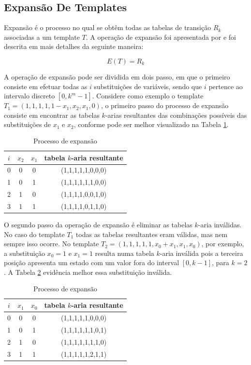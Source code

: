 \documentclass[12pt,a4paper]{article}
\begin{document}
\newpage\newpage
\subsection{Expansão De Templates}
	Expansão é o processo no qual se obtêm todas as tabelas de transição $R_k$ associadas a um template $T$.
	A operação de expansão foi apresentada por  e foi descrita em mais detalhes da seguinte maneira:

	\begin{equation}
	E(T)=R_k
	\end{equation}

	A operação de expansão pode ser dividida em dois passo, em que o primeiro consiste em efetuar todas as $i$ substituições de variáveis, sendo que $i$ pertence ao intervalo discreto $[0,k^m-1]$. Considere como exemplo o template $T_1 = (1,1,1,1,1-x_1,x_2,x_1,0)$, o primeiro passo do processo de expansão consiste em encontrar as tabelas $k$-arias resultantes das combinações possíveis das substituições de $x_1$ e $x_2$, conforme pode ser melhor visualizado na Tabela \ref{tab:expansionProcess}.

	\begin{table}[h!]
	\centering
	\caption{Processo de expansão}
	{
		\vspace{0.3cm}
		\begin{tabular}{cccc}
		\hline
		$i$ & $x_2$ & $x_1$ & tabela $k$-aria resultante \\
		\hline
		0	&	0	&	0	&	(1,1,1,1,1,0,0,0)	\\
		1	&	0	&	1	&	(1,1,1,1,1,1,0,0)	\\
		2	&	1	&	0	&	(1,1,1,1,0,0,1,0)	\\
		3	&	1	&	1	&	(1,1,1,1,0,1,1,0)	\\
		\hline
		\end{tabular}
	}
	\label{tab:expansionProcess}
	\end{table}

	O segundo passo da operação de expansão é eliminar as tabelas $k$-aria inválidas. No caso do template $T_1$ todas as tabelas resultantes eram válidas, mas nem sempre isso ocorre. No template $T_2 = (1,1,1,1,1,x_0+x_1,x_1,x_0)$, por exemplo, a substituição $x_0 = 1$ e $x_1 = 1$ resulta numa tabela $k$-aria inválida pois a terceira posição apresenta um estado com um valor fora do interval $[0,k-1]$, para $k=2$. A Tabela \ref{tab:invalideExpansion} evidência melhor essa substituição inválida.

	\begin{table}[h!]
	\centering
	\caption{Processo de expansão}
	{
		\vspace{0.3cm}
		\begin{tabular}{cccc}
		\hline
		$i$ & $x_1$ & $x_0$ & tabela $k$-aria resultante \\
		\hline
		0	&	0	&	0	&	(1,1,1,1,1,0,0,0)	\\
		1	&	0	&	1	&	(1,1,1,1,1,1,0,1)	\\
		2	&	1	&	0	&	(1,1,1,1,1,1,1,0)	\\
		3	&	1	&	1	&	(1,1,1,1,1,2,1,1)	\\
		\hline
		\end{tabular}
	}
	\label{tab:invalideExpansion}
	\end{table}
\end{document}
